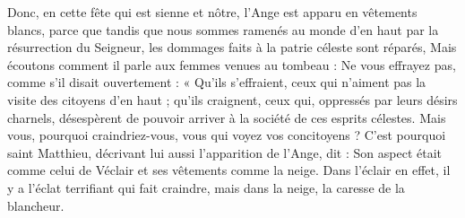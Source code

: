  Donc, en cette fête qui est sienne et nôtre, l’Ange est apparu en vêtements blancs, parce que tandis que nous sommes ramenés au monde d’en haut par la résurrection du Seigneur, les dommages faits à la patrie céleste sont réparés, Mais écoutons comment il parle aux femmes venues au tombeau : Ne vous effrayez pas, comme s’il disait ouvertement : « Qu’ils s’effraient, ceux qui n’aiment pas la visite des citoyens d’en haut ; qu’ils craignent, ceux qui, oppressés par leurs désirs charnels, désespèrent de pouvoir arriver à la société de ces esprits célestes. Mais vous, pourquoi craindriez-vous, vous qui voyez vos concitoyens ? C’est pourquoi saint Matthieu, décrivant lui aussi l’apparition de l’Ange, dit : Son aspect était comme celui de Véclair et ses vêtements comme la neige. Dans l’éclair en effet, il y a l’éclat terrifiant qui fait craindre, mais dans la neige, la caresse de la blancheur.